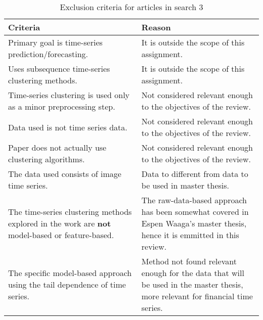 \begin{table*}
    \centering
    \begin{tabular}{p{}p{}}
        \toprule
        Criteria                                                                                               & Reason \\
        \midrule
        Primary goal is time-series prediction/forecasting.                                                    & It is outside the scope of this assignment.\\
        Uses subsequence time-series clustering methods.                                                       & It is outside the scope of this assignment.\\
        Time-series clustering is used only as a minor preprocessing step.                                     & Not considered relevant enough to the objectives of the review.\\
        Data used is not time series data.                                                                     & Not considered relevant enough to the objectives of the review.\\
        Paper does not actually use clustering algorithms.                                                     & Not considered relevant enough to the objectives of the review.\\
        The data used consists of image time series.                                                           & Data to different from data to be used in master thesis.\\
        The time-series clustering methods explored in the work are \textbf{not} model-based or feature-based. & The raw-data-based approach has been somewhat covered in Espen Waaga's master thesis, hence it is emmitted in this review.\\
        The specific model-based approach using the tail dependence of time series.                            & Method not found relevant enough for the data that will be used in the master thesis, more relevant for financial time series.\\
        \bottomrule
    \end{tabular}
    \caption{Exclusion criteria for articles in search 3}
    \label{tab:excl_crit}
\end{table*}
